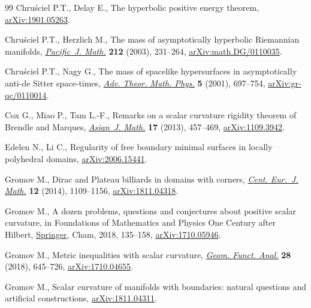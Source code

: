 \documentclass[10pt,a4paper]{amsart}
\numberwithin{equation}{section}
\theoremstyle{definition}
\begin{document}
\begin{thebibliography}{99}
Chru\'sciel P.T., Delay E., The hyperbolic positive energy theorem,
 \href{https://arxiv.org/abs/1901.05263}{arXiv:1901.05263}.

Chru\'sciel P.T., Herzlich M., The mass of asymptotically hyperbolic
 {R}iemannian manifolds, \href{https://doi.org/10.2140/pjm.2003.212.231}{\textit{Pacific~J. Math.}} \textbf{212} (2003),
 231--264, \href{https://arxiv.org/abs/math.DG/0110035}{arXiv:math.DG/0110035}.

Chru\'sciel P.T., Nagy G., The mass of spacelike hypersurfaces in
 asymptotically anti-de {S}itter space-times, \href{https://doi.org/10.4310/ATMP.2001.v5.n4.a3}{\textit{Adv. Theor. Math. Phys.}}
 \textbf{5} (2001), 697--754, \href{https://arxiv.org/abs/gr-qc/0110014}{arXiv:gr-qc/0110014}.

Cox G., Miao P., Tam L.-F., Remarks on a scalar curvature rigidity theorem of
 {B}rendle and {M}arques, \href{https://doi.org/10.4310/AJM.2013.v17.n3.a4}{\textit{Asian~J. Math.}} \textbf{17} (2013),
 457--469, \href{https://arxiv.org/abs/1109.3942}{arXiv:1109.3942}.

Edelen N., Li C., Regularity of free boundary minimal surfaces in locally
 polyhedral domains, \href{https://arxiv.org/abs/2006.15441}{arXiv:2006.15441}.

Gromov M., Dirac and {P}lateau billiards in domains with corners, \href{https://doi.org/10.2478/s11533-013-0399-1}{\textit{Cent.
 Eur.~J. Math.}} \textbf{12} (2014), 1109--1156, \href{https://arxiv.org/abs/1811.04318}{arXiv:1811.04318}.

Gromov M., A dozen problems, questions and conjectures about positive scalar
 curvature, in Foundations of Mathematics and Physics One Century after
 {H}ilbert, \href{https://doi.org/10.1007/978-3-319-64813-2_6}{Springer}, Cham, 2018, 135--158, \href{https://arxiv.org/abs/1710.05946}{arXiv:1710.05946}.

Gromov M., Metric inequalities with scalar curvature, \href{https://doi.org/10.1007/s00039-018-0453-z}{\textit{Geom. Funct.
 Anal.}} \textbf{28} (2018), 645--726, \href{https://arxiv.org/abs/1710.04655}{arXiv:1710.04655}.

Gromov M., Scalar curvature of manifolds with boundaries: natural questions and
 artificial constructions, \href{https://arxiv.org/abs/1811.04311}{arXiv:1811.04311}.


\end{thebibliography}
\end{document}
